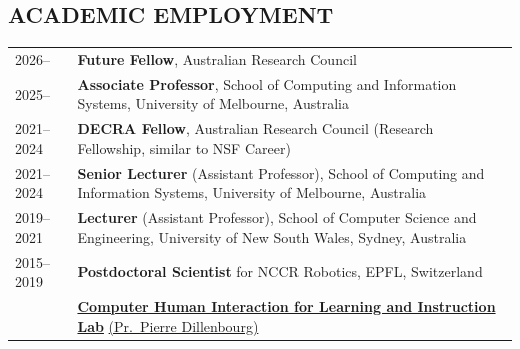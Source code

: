 
\subsection{ACADEMIC EMPLOYMENT}
\vspace{2pt}

\noindent
\begin{tabularx}{\textwidth}{@{}lX@{}}
2026--      & \textbf{Future Fellow}, Australian Research Council \\[3pt]
2025--      & \textbf{Associate Professor}, School of Computing and Information Systems, University of Melbourne, Australia \\[3pt]
2021--2024  & \textbf{DECRA Fellow}, Australian Research Council (Research Fellowship, similar to NSF Career) \\[3pt]
2021--2024  & \textbf{Senior Lecturer} (Assistant Professor), School of Computing and Information Systems, University of Melbourne, Australia \\[3pt]
2019--2021  & \textbf{Lecturer} (Assistant Professor), School of Computer Science and Engineering, University of New South Wales, Sydney, Australia \\[3pt]
2015--2019  & \textbf{Postdoctoral Scientist} for NCCR Robotics, EPFL, Switzerland \\
            & \quad \href{http://www.chili.epfl.ch/}{\textbf{Computer Human Interaction for Learning and Instruction Lab}} \href{https://people.epfl.ch/pierre.dillenbourg}{(Pr.\ Pierre Dillenbourg)} \\

\end{tabularx}
